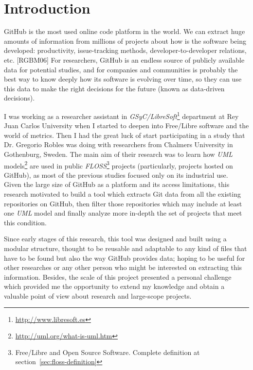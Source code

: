 \documentclass[a4paper, 12pt]{book}
\begin{document}

\cleardoublepage
\chapter{Introduction}
\label{sec:intro} %
GitHub is the most used online code platform in the world. We can extract huge amounts of information from millions of projects
about how is the software being developed: productivity, issue-tracking methods, developer-to-developer relations, etc. [RGBM06]
For researchers, GitHub is an endless source of publicly available data for potential studies, and for companies and communities
is probably the best way to know deeply how its software is evolving over time, so they can use this data to make the right decisions
for the future (known as data-driven decisions).\par
I was working as a researcher assistant in \emph{GSyC/LibreSoft}\footnote{\url{http://www.libresoft.es}} department at
Rey Juan Carlos University when I started to deepen into Free/Libre software and the world of metrics.
Then I had the great luck of start participating in a study that
Dr. Gregorio Robles was doing with researchers from Chalmers University in Gothenburg, Sweden. The main aim of their research was to
learn how \emph{UML} models\footnote{\url{http://uml.org/what-is-uml.htm}} are used in public
\emph{FLOSS}\footnote{Free/Libre and Open Source Software. Complete definition at section~\ref{sec:floss-definition}} projects
(particularly, projects hosted on GitHub), as most of the previous studies focused only on its industrial use.\\
Given the large size of GitHub as a platform and its access limitations, this research motivated to build a tool which extracts
Git data from all the existing repositories on GitHub, then filter those repositories which may include at least one
\emph{UML} model and finally analyze more in-depth the set of projects that meet this condition.\par
Since early stages of this research, this tool was designed and built using a modular structure, thought to be reusable
and adaptable to any kind of files that have to be found but also the way GitHub provides data; hoping to be useful
for other researches or any other person who might be interested on extracting this information. Besides, the scale of this project
presented a personal challenge which provided me the opportunity to extend my knowledge and obtain a valuable point of
view about research and large-scope projects.
\end{document}
